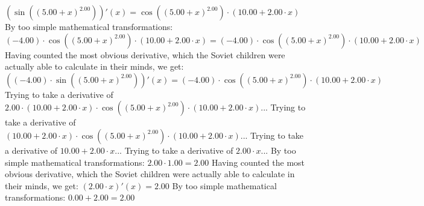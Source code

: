 \documentclass{article}
\begin{document}
$( \sin {\left({\left({{5.00} + {x}}\right) ^ {2.00}}\right)} )'(x) = { \cos {\left({\left({{5.00} + {x}}\right) ^ {2.00}}\right)}  \cdot \left({{10.00} + {{2.00} \cdot {x}}}\right)}$\newline
\newline
By too simple mathematical transformations:
 ${\left({-4.00}\right) \cdot { \cos {\left({\left({{5.00} + {x}}\right) ^ {2.00}}\right)}  \cdot \left({{10.00} + {{2.00} \cdot {x}}}\right)}} = {\left({-4.00}\right) \cdot { \cos {\left({\left({{5.00} + {x}}\right) ^ {2.00}}\right)}  \cdot \left({{10.00} + {{2.00} \cdot {x}}}\right)}}$ 
 \newline
 \newline 
Having counted the most obvious derivative, which the Soviet children were actually able to calculate in their minds, we get:
$({\left({-4.00}\right) \cdot  \sin {\left({\left({{5.00} + {x}}\right) ^ {2.00}}\right)} })'(x) = {\left({-4.00}\right) \cdot { \cos {\left({\left({{5.00} + {x}}\right) ^ {2.00}}\right)}  \cdot \left({{10.00} + {{2.00} \cdot {x}}}\right)}}$\newline
\newline
Trying to take a derivative of ${{2.00} \cdot {\left({{10.00} + {{2.00} \cdot {x}}}\right) \cdot { \cos {\left({\left({{5.00} + {x}}\right) ^ {2.00}}\right)}  \cdot \left({{10.00} + {{2.00} \cdot {x}}}\right)}}}$...\newline
\newline
Trying to take a derivative of ${\left({{10.00} + {{2.00} \cdot {x}}}\right) \cdot { \cos {\left({\left({{5.00} + {x}}\right) ^ {2.00}}\right)}  \cdot \left({{10.00} + {{2.00} \cdot {x}}}\right)}}$...\newline
\newline
Trying to take a derivative of ${{10.00} + {{2.00} \cdot {x}}}$...\newline
\newline
Trying to take a derivative of ${{2.00} \cdot {x}}$...\newline
\newline
By too simple mathematical transformations:
 ${{2.00} \cdot {1.00}} = {2.00}$ 
 \newline
 \newline 
Having counted the most obvious derivative, which the Soviet children were actually able to calculate in their minds, we get:
$({{2.00} \cdot {x}})'(x) = {2.00}$\newline
\newline
By too simple mathematical transformations:
 ${{0.00} + {2.00}} = {2.00}$ 
\end{document}
